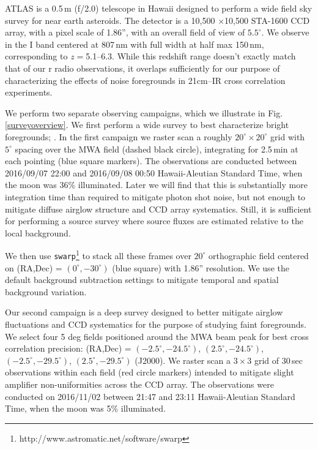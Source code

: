 \documentclass[preprint]{aastex}
\begin{document}
ATLAS is a 0.5\,m (f/2.0) telescope \citep{tonry11} in Hawaii designed to perform a wide field sky survey for near earth asteroids. The detector is a 10,500 $\times$10,500 STA-1600 CCD array, with a pixel scale of 1.86'', with an overall field of view of $5.5^\circ$. We observe in the I band centered at 807\,nm with full width at half max 150\,nm, corresponding to $z=$5.1--6.3. While this redshift range doesn't exactly match that of our r radio observations, it overlaps sufficiently for our purpose of characterizing the effects of noise foregrounds in 21cm--IR cross correlation experiments. 

We perform two separate observing campaigns, which we illustrate in Fig. \ref{surveyoverview}. We first perform a wide survey to best characterize bright foregrounds; . In the first campaign we raster scan a roughly $20^\circ\times20^\circ$ grid with $5^\circ$ spacing over the MWA field (dashed black circle), integrating for 2.5\,min at each pointing (blue square markers). The observations are conducted between 2016/09/07 22:00  and 2016/09/08 00:50 Hawaii-Aleutian Standard Time, when the moon was 36\% illuminated.  Later we will find that this is substantially more integration time than required to mitigate photon shot noise, but not enough to mitigate diffuse airglow structure and CCD array systematics. Still, it is sufficient for performing a source survey where source fluxes are estimated relative to the local background. 

We then use {\tt swarp}\footnote{http://www.astromatic.net/software/swarp} \citep{swarp} to stack all these frames over $20^\circ$ orthographic field centered on (RA,Dec) = $(0^\circ,-30^\circ)$ (blue square) with 1.86'' resolution. We use the default background subtraction settings to mitigate temporal and spatial background variation. 


Our second campaign is a deep survey designed to better mitigate airglow fluctuations and CCD systematics for the purpose of studying faint foregrounds. We select four 5 deg fields positioned around the MWA beam peak for best cross correlation precision: (RA,Dec) = $(-2.5^\circ, -24.5^\circ)$, $(2.5^\circ, -24.5^\circ)$, $(-2.5^\circ, -29.5^\circ)$, $(2.5^\circ, -29.5^\circ)$ (J2000). We raster scan a $3\times3$ grid of 30\,sec observations within each field (red circle markers) intended to mitigate slight amplifier non-uniformities across the CCD array. The observations were conducted on 2016/11/02 between 21:47 and 23:11 Hawaii-Aleutian Standard Time, when the moon was 5\% illuminated.
\end{document}

